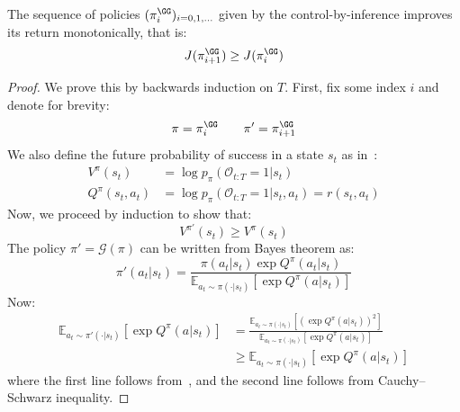 \begin{proposition}
    The sequence of policies $(\pi^\GG_i)_{i = 0, 1, \dots}$ given by the control-by-inference improves its return monotonically, that is:
    \[
    J(\pi^\GG_{i + 1}) \geq J(\pi^\GG_{i}) 
    \]
\end{proposition}
\begin{proof}    
    We prove this by backwards induction on $T$. First, fix some index $i$ and denote for brevity:
    \[
    \pi = \pi^\GG_i \qquad \pi' = \pi^\GG_{i+1}
    \]
    We also define the future probability of success in a state $s_t$ as in~:
    \begin{align*}
    V^\pi(s_t) &= \log p_\pi(\mathcal{O}_{t:T} = 1| s_t) \\
    Q^\pi(s_t, a_t) &= \log  p_\pi(\mathcal{O}_{t:T} = 1| s_t, a_t) = r(s_t, a_t)
    \end{align*}
    Now, we proceed by induction to show that:
    \[
    V^{\pi'}(s_t) \geq V^{\pi}(s_t)
    \]
    The policy $\pi' = \mathcal{G}(\pi)$ can be written from Bayes theorem as:
    \begin{equation}\label{eq:posterior}
    \pi'(a_t|s_t) = \frac{\pi(a_t|s_t) \exp Q^\pi(a_t|s_t)}{\mathbb{E}_{a_t \sim \pi(\cdot|s_t)}[\exp Q^\pi(a|s_t)]}    
    \end{equation}
    Now:
    \begin{equation}\label{eq:inequality}
    \begin{aligned}
        \mathbb{E}_{a_t \sim \pi'(\cdot|s_t)}[\exp Q^\pi(a|s_t)]
        &= \frac{\mathbb{E}_{a_t \sim \pi(\cdot|s_t)}\left[\left(\exp Q^\pi(a|s_t)\right)^2\right]}{\mathbb{E}_{a_t \sim \pi(\cdot|s_t)}[\exp Q^\pi(a|s_t)]} \\
        & \geq \mathbb{E}_{a_t \sim \pi(\cdot|s_t)}[\exp Q^\pi(a|s_t)]
    \end{aligned}
    \end{equation}
    where the first line follows from~, and the second line follows from Cauchy–Schwarz inequality.
    

\end{proof}
